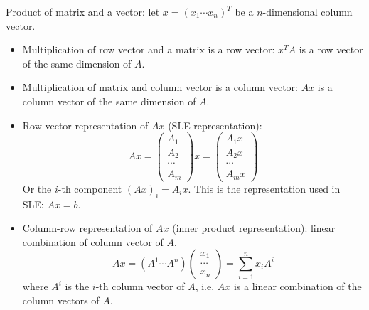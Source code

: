 \documentclass{report}
\begin{document}
Product of matrix and a vector: let $x = (x_1 \cdots x_n)^T$ be a $n$-dimensional column vector. 
\begin{itemize}
	\item Multiplication of row vector and a matrix is a row vector: $x^T A$ is a row vector of the same dimension of $A$. 
	
	\item Multiplication of matrix and column vector is a column vector: $Ax$ is a column vector of the same dimension of $A$. 
	
	\item Row-vector representation of $Ax$ (SLE representation):
	\begin{equation}
	Ax = 	\left( \begin{array}{c} A_1 \\ A_2 \\ \cdots \\ A_m \end{array} \right) x = \left( \begin{array}{c} A_1x \\ A_2x \\ \cdots \\ A_mx \end{array} \right)
	\end{equation}
	Or the $i$-th component $(Ax)_i = A_i x$. This is the representation used in SLE: $Ax = b$.
	
	\item Column-row representation of $Ax$ (inner product representation): linear combination of column vector of $A$. 
	\begin{equation}
	Ax = (A^1 \cdots A^n) \left( \begin{array}{c} x_1\\ \cdots \\ x_n \end{array} \right) = \sum_{i=1}^n x_i A^i
	\label{eq:dotproduct_matrix}
	\end{equation}
	where $A^i$ is the $i$-th column vector of $A$, i.e. $Ax$ is a linear combination of the column vectors of $A$. 
\end{itemize}
\end{document}
